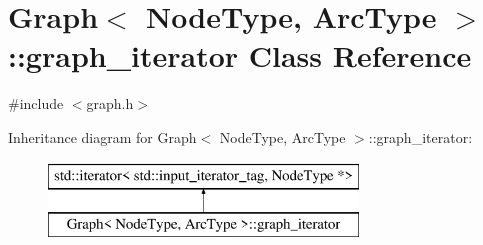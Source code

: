 \hypertarget{classGraph_1_1graph__iterator}{}\section{Graph$<$ Node\+Type, Arc\+Type $>$\+:\+:graph\+\_\+iterator Class Reference}
\label{classGraph_1_1graph__iterator}


{\ttfamily \#include $<$graph.\+h$>$}

Inheritance diagram for Graph$<$ Node\+Type, Arc\+Type $>$\+:\+:graph\+\_\+iterator\+:\begin{figure}[H]
\begin{center}
\leavevmode
\includegraphics[height=2.000000cm]{classGraph_1_1graph__iterator}
\end{center}
\end{figure}
